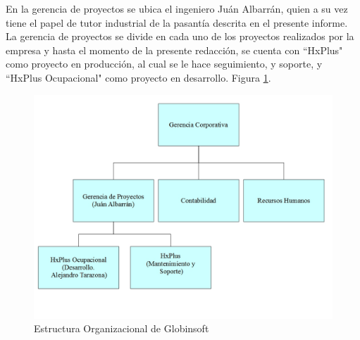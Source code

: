     En la gerencia de proyectos se ubica el ingeniero Juán Albarrán, quien a su vez tiene el papel de tutor industrial de la pasantía descrita en el presente informe. La gerencia de proyectos se divide en cada uno de los proyectos realizados por la empresa y hasta el momento de la presente redacción, se cuenta con ``HxPlus" como proyecto en producción, al cual se le hace seguimiento, y soporte, y ``HxPlus Ocupacional" como proyecto en desarrollo. Figura \ref{estructura-org}.
    
    \begin{figure}[htbp!]
        \begin{center}
            \includegraphics[width=.8\textwidth]{figures/Estructura}
        \end{center}
        \caption{Estructura Organizacional de Globinsoft}
        \label{estructura-org}
    \end{figure}

\pagebreak